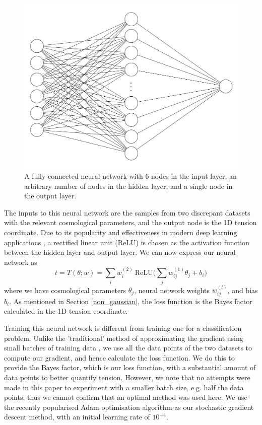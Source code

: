 \documentclass[%
 reprint,
 amsmath,amssymb,
 aps,
]{revtex4-2}
\begin{document}
\begin{figure}
    \includegraphics[width=0.8\columnwidth]{images/nn.png}
    \centering
    \caption{A fully-connected neural network with 6 nodes in the input layer, an arbitrary number of nodes in the hidden layer, and a single node in the output layer.}
    \label{fig:NN}
\end{figure}

The inputs to this neural network are the samples from two discrepant datasets with the relevant cosmological parameters, and the output node is the 1D tension coordinate. Due to its popularity and effectiveness in modern deep learning applications \cite{Nwankpa2018}, a rectified linear unit (ReLU) \cite{Nair2010} is chosen as the activation function between the hidden layer and output layer. We can now express our neural network as
\begin{equation}
    t = T(\theta; w) = \sum_i w^{(2)}_i \ \textrm{ReLU} \bigg( \sum_j w^{(1)}_{ij} \theta_j + b_i \bigg)
\end{equation}
where we have cosmological parameters $\theta_{j}$, neural network weights $w^{(l)}_{ij}$, and bias $b_i$. As mentioned in Section \ref{non_gaussian}, the loss function is the Bayes factor calculated in the 1D tension coordinate.

Training this neural network is different from training one for a classification problem. Unlike the 'traditional' method of approximating the gradient using small batches of training data \cite{Keskar2017}, we use all the data points of the two datasets to compute our gradient, and hence calculate the loss function. We do this to provide the Bayes factor, which is our loss function, with a substantial amount of data points to better quantify tension. However, we note that no attempts were made in this paper to experiment with a smaller batch size, e.g. half the data points, thus we cannot confirm that an optimal method was used here. We use the recently popularised Adam optimisation algorithm \cite{Kingma2017} as our stochastic gradient descent method, with an initial learning rate of $10^{-4}$.
\end{document}
